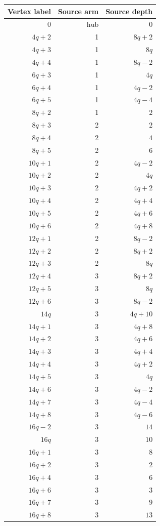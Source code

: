 \begin{longtable}{rrr}
Vertex label & Source arm & Source depth\\\hline\endhead
$0$ & $\mathrm{hub}$ & $0$\\
$4q+2$ & 1 & $8q+2$\\
$4q+3$ & 1 & $8q$\\
$4q+4$ & 1 & $8q-2$\\
$6q+3$ & 1 & $4q$\\
$6q+4$ & 1 & $4q-2$\\
$6q+5$ & 1 & $4q-4$\\
$8q+2$ & 1 & $2$\\
$8q+3$ & 2 & $2$\\
$8q+4$ & 2 & $4$\\
$8q+5$ & 2 & $6$\\
$10q+1$ & 2 & $4q-2$\\
$10q+2$ & 2 & $4q$\\
$10q+3$ & 2 & $4q+2$\\
$10q+4$ & 2 & $4q+4$\\
$10q+5$ & 2 & $4q+6$\\
$10q+6$ & 2 & $4q+8$\\
$12q+1$ & 2 & $8q-2$\\
$12q+2$ & 2 & $8q+2$\\
$12q+3$ & 2 & $8q$\\
$12q+4$ & 3 & $8q+2$\\
$12q+5$ & 3 & $8q$\\
$12q+6$ & 3 & $8q-2$\\
$14q$ & 3 & $4q+10$\\
$14q+1$ & 3 & $4q+8$\\
$14q+2$ & 3 & $4q+6$\\
$14q+3$ & 3 & $4q+4$\\
$14q+4$ & 3 & $4q+2$\\
$14q+5$ & 3 & $4q$\\
$14q+6$ & 3 & $4q-2$\\
$14q+7$ & 3 & $4q-4$\\
$14q+8$ & 3 & $4q-6$\\
$16q-2$ & 3 & $14$\\
$16q$ & 3 & $10$\\
$16q+1$ & 3 & $8$\\
$16q+2$ & 3 & $2$\\
$16q+4$ & 3 & $6$\\
$16q+6$ & 3 & $3$\\
$16q+7$ & 3 & $9$\\
$16q+8$ & 3 & $13$\\

\end{longtable}

